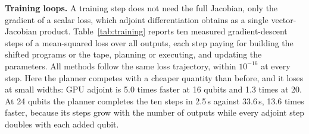 \textbf{Training loops.} A training step does not need the full Jacobian, only the gradient of a scalar loss, which adjoint differentiation obtains as a single vector-Jacobian product. Table~\ref{tab:training} reports ten measured gradient-descent steps of a mean-squared loss over all outputs, each step paying for building the shifted programs or the tape, planning or executing, and updating the parameters. All methods follow the same loss trajectory, within $10^{-16}$ at every step. Here the planner competes with a cheaper quantity than before, and it loses at small widths: GPU adjoint is 5.0 times faster at 16 qubits and 1.3 times at 20. At 24 qubits the planner completes the ten steps in 2.5\,s against 33.6\,s, 13.6 times faster, because its steps grow with the number of outputs while every adjoint step doubles with each added qubit.
